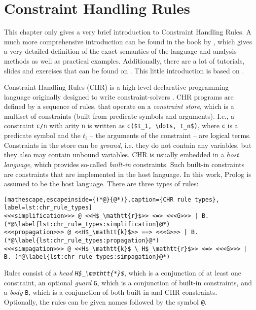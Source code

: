 \chapter{Constraint Handling Rules}

This chapter only gives a very brief introduction to Constraint Handling Rules. A much more comprehensive introduction can be found in the book  by \citeauthor{fru_chr_book_2009} \cite{fru_chr_book_2009}, which gives a very detailed definition of the exact semantics of the language and analysis methods as well as practical examples. Additionally, there are a lot of tutorials, slides and exercises that can be found on  \cite{chr_homepage}. This little introduction is based on \cite{fru_chr_book_2009}.

Constraint Handling Rules (CHR) is a high-level declarative programming language originally designed to write constraint-solvers \cite[2]{chr_survey_tplp10}. CHR programs are defined by a sequence of rules, that operate on a \emph{constraint store}, which is a multiset of constraints (built from predicate symbols and arguments). I.e., a constraint \lstinline|c/n| with arity \lstinline|n| is written as \lstinline[mathescape]|c($t_1, \dots, t_n$)|, where \lstinline|c| is a predicate symbol and the $t_i$ -- the arguments of the constraint -- are logical terms. Constraints in the store can be \emph{ground}, i.e. they do not contain any variables, but they also may contain unbound variables. CHR is usually embedded in a \emph{host language}, which provides so-called \emph{built-in} constraints. Such built-in constraints are constraints that are implemented in the host language. In this work, Prolog is assumed to be the host language. There are three types of rules:

\begin{lstlisting}[mathescape,escapeinside={(*@}{@*)},caption={CHR rule types}, label=lst:chr_rule_types]
<<<simplification>>> @ <<H$_\mathtt{r}$>> <=> <<<G>>> | B. (*@\label{lst:chr_rule_types:simplification}@*)
<<<propagation>>> @ <<H$_\mathtt{k}$>> ==> <<<G>>> | B. (*@\label{lst:chr_rule_types:propagation}@*)
<<<simpagation>>> @ <<H$_\mathtt{k}$ \ H$_\mathtt{r}$>> <=> <<<G>>> | B. (*@\label{lst:chr_rule_types:simpagation}@*)
\end{lstlisting}

Rules consist of a \emph{head \lstinline[mathescape]|H$_\mathtt{*}$|}, which is a conjunction of at least one constraint, an optional \emph{guard} \lstinline|G|, which is a conjunction of built-in constraints, and a \emph{body} \lstinline|B|, which is a conjunction of both built-in and CHR constraints. Optionally, the rules can be given names followed by the symbol \lstinline|@|.


